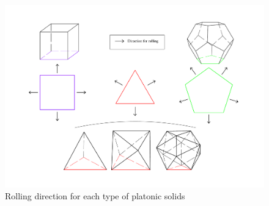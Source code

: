 \noindent  
% 
%
%
\begin{figure}[h]
\centering
	\includegraphics[width=1\textwidth]{image/rollingDir2.pdf}
	\caption{Rolling direction for each type of platonic solids}
	\label{fig:rollingDir}
\end{figure}
%
% 
%
%
%
%
\clearpage
\newpage
